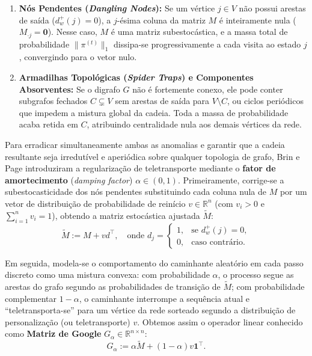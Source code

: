\documentclass[10pt,a4paper]{article}
\theoremstyle{definition}
\theoremstyle{plain}
\theoremstyle{remark}
\begin{document}
\begin{enumerate}
    \item \textbf{Nós Pendentes (\textit{Dangling Nodes}):} Se um vértice $j \in V$ não possui arestas de saída ($d^{+}_{w}(j) = 0$), a $j$-ésima coluna da matriz $M$ é inteiramente nula ($M_{\cdot j} = \mathbf{0}$). Nesse caso, $M$ é uma matriz subestocástica, e a massa total de probabilidade $\|\pi^{(t)}\|_1$ dissipa-se progressivamente a cada visita ao estado $j$, convergindo para o vetor nulo.
    \item \textbf{Armadilhas Topológicas (\textit{Spider Traps}) e Componentes Absorventes:} Se o digrafo $G$ não é fortemente conexo, ele pode conter subgrafos fechados $C \subsetneq V$ sem arestas de saída para $V \setminus C$, ou ciclos periódicos que impedem a mistura global da cadeia. Toda a massa de probabilidade acaba retida em $C$, atribuindo centralidade nula aos demais vértices da rede.
\end{enumerate}

Para erradicar simultaneamente ambas as anomalias e garantir que a cadeia resultante seja irredutível e aperiódica sobre qualquer topologia de grafo, Brin e Page \cite{brin1998} introduziram a regularização de teletransporte mediante o \textbf{fator de amortecimento} (\textit{damping factor}) $\alpha \in (0, 1)$. Primeiramente, corrige-se a subestocasticidade dos nós pendentes substituindo cada coluna nula de $M$ por um vetor de distribuição de probabilidade de reinício $v \in \mathbb{R}^n$ (com $v_i > 0$ e $\sum_{i=1}^{n} v_i = 1$), obtendo a matriz estocástica ajustada $\widetilde{M}$:
\begin{equation}
\widetilde{M} := M + v d^{\top}, \quad \text{onde } d_j = \begin{cases} 1, & \text{se } d^{+}_{w}(j) = 0, \\ 0, & \text{caso contrário.} \end{cases}
\label{eq:m_tilde}
\end{equation}

Em seguida, modela-se o comportamento do caminhante aleatório em cada passo discreto como uma mistura convexa: com probabilidade $\alpha$, o processo segue as arestas do grafo segundo as probabilidades de transição de $\widetilde{M}$; com probabilidade complementar $1 - \alpha$, o caminhante interrompe a sequência atual e ``teletransporta-se'' para um vértice da rede sorteado segundo a distribuição de personalização (ou teletransporte) $v$. Obtemos assim o operador linear conhecido como \textbf{Matriz de Google} $G_{\alpha} \in \mathbb{R}^{n \times n}$:
\begin{equation}
G_{\alpha} := \alpha \widetilde{M} + (1 - \alpha) v \mathbf{1}^{\top}.
\label{eq:google_matrix}
\end{equation}
\end{document}
